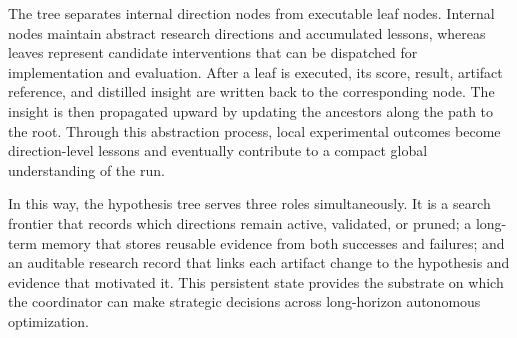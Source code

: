 \documentclass{llmxive}
\begin{document}
The tree separates internal direction nodes from executable leaf nodes. Internal nodes maintain abstract research directions and accumulated lessons, whereas leaves represent candidate interventions that can be dispatched for implementation and evaluation. After a leaf is executed, its score, result, artifact reference, and distilled insight are written back to the corresponding node. The insight is then propagated upward by updating the ancestors along the path to the root. Through this abstraction process, local experimental outcomes become direction-level lessons and eventually contribute to a compact global understanding of the run.

In this way, the hypothesis tree serves three roles simultaneously. It is a search frontier that records which directions remain active, validated, or pruned; a long-term memory that stores reusable evidence from both successes and failures; and an auditable research record that links each artifact change to the hypothesis and evidence that motivated it. This persistent state provides the substrate on which the coordinator can make strategic decisions across long-horizon autonomous optimization.
\end{document}
